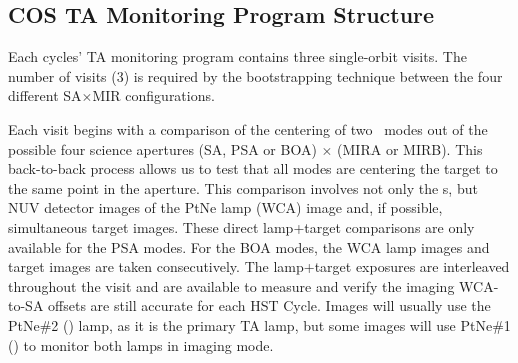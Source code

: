 \subsection{COS TA Monitoring Program Structure}\label{subsec:structure}

Each cycles' TA monitoring program contains three single-orbit visits. The number of visits (3) is required by the bootstrapping technique between the four different  SA$\times$MIR configurations.

Each visit begins with a comparison of the centering of two ~modes out of the possible four science apertures (SA, PSA or BOA) $\times$ (MIRA or MIRB).
This back-to-back process allows us to test that all  modes are centering the target to the same point in the aperture.
This comparison involves not only the s, but NUV detector images of the PtNe lamp (WCA) image and, if possible, simultaneous target images.
These direct lamp+target comparisons are only available for the PSA modes. For the BOA modes, the WCA lamp images and target images are taken consecutively.
The lamp+target exposures are interleaved throughout the visit and are available to measure and verify the imaging WCA-to-SA offsets are still accurate for each HST Cycle.
Images will usually use the PtNe\#2 (\plamptwo{}) lamp, as it is the primary TA lamp, but some images will use PtNe\#1 (\plampone{}) to monitor both lamps in imaging mode.

